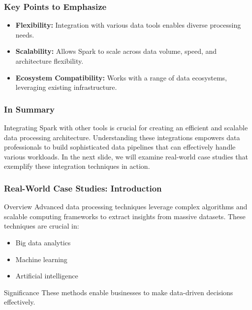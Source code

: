 \documentclass[aspectratio=169]{beamer}
\begin{document}
\begin{frame}
    \frametitle{Key Points to Emphasize}
    \begin{itemize}
        \item \textbf{Flexibility:} Integration with various data tools enables diverse processing needs.
        \item \textbf{Scalability:} Allows Spark to scale across data volume, speed, and architecture flexibility.
        \item \textbf{Ecosystem Compatibility:} Works with a range of data ecosystems, leveraging existing infrastructure.
    \end{itemize}
\end{frame}

\begin{frame}
    \frametitle{In Summary}
    Integrating Spark with other tools is crucial for creating an efficient and scalable data processing architecture. Understanding these integrations empowers data professionals to build sophisticated data pipelines that can effectively handle various workloads. In the next slide, we will examine real-world case studies that exemplify these integration techniques in action.
\end{frame}

\begin{frame}[fragile]
    \frametitle{Real-World Case Studies: Introduction}
    \begin{block}{Overview}
        Advanced data processing techniques leverage complex algorithms and scalable computing frameworks to extract insights from massive datasets. These techniques are crucial in:
    \end{block}
    \begin{itemize}
        \item Big data analytics
        \item Machine learning
        \item Artificial intelligence
    \end{itemize}
    \begin{block}{Significance}
        These methods enable businesses to make data-driven decisions effectively.
    \end{block}
\end{frame}
\end{document}
